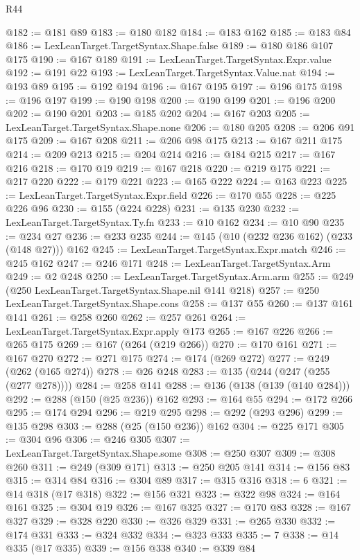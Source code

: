 \begin{lexlean}{R44}
\begin{coremodule}
@182 := @181 @89
@183 := @180 @182
@184 := @183 @162
@185 := @183 @84
@186 := LexLeanTarget.TargetSyntax.Shape.false
@189 := @180 @186 @107 @175
@190 := @167 @189
@191 := LexLeanTarget.TargetSyntax.Expr.value
@192 := @191 @22
@193 := LexLeanTarget.TargetSyntax.Value.nat
@194 := @193 @89
@195 := @192 @194
@196 := @167 @195
@197 := @196 @175
@198 := @196 @197
@199 := @190 @198
@200 := @190 @199
@201 := @196 @200
@202 := @190 @201
@203 := @185 @202
@204 := @167 @203
@205 := LexLeanTarget.TargetSyntax.Shape.none
@206 := @180 @205
@208 := @206 @91 @175
@209 := @167 @208
@211 := @206 @98 @175
@213 := @167 @211 @175
@214 := @209 @213
@215 := @204 @214
@216 := @184 @215
@217 := @167 @216
@218 := @170 @19
@219 := @167 @218
@220 := @219 @175
@221 := @217 @220
@222 := @179 @221
@223 := @165 @222
@224 := @163 @223
@225 := LexLeanTarget.TargetSyntax.Expr.field
@226 := @170 @55
@228 := @225 @226 @96
@230 := @155 (@224 @228)
@231 := @135 @230
@232 := LexLeanTarget.TargetSyntax.Ty.fn
@233 := @10 @162
@234 := @10 @90
@235 := @234 @27
@236 := @233 @235
@244 := @145 (@10 (@232 @236 @162) (@233 (@148 @27))) @162
@245 := LexLeanTarget.TargetSyntax.Expr.match
@246 := @245 @162
@247 := @246 @171
@248 := LexLeanTarget.TargetSyntax.Arm
@249 := @2 @248
@250 := LexLeanTarget.TargetSyntax.Arm.arm
@255 := @249 (@250 LexLeanTarget.TargetSyntax.Shape.nil @141 @218)
@257 := @250 LexLeanTarget.TargetSyntax.Shape.cons
@258 := @137 @55
@260 := @137 @161 @141
@261 := @258 @260
@262 := @257 @261
@264 := LexLeanTarget.TargetSyntax.Expr.apply @173
@265 := @167 @226
@266 := @265 @175
@269 := @167 (@264 (@219 @266))
@270 := @170 @161
@271 := @167 @270
@272 := @271 @175
@274 := @174 (@269 @272)
@277 := @249 (@262 (@165 @274))
@278 := @26 @248
@283 := @135 (@244 (@247 (@255 (@277 @278))))
@284 := @258 @141
@288 := @136 (@138 (@139 (@140 @284)))
@292 := @288 (@150 (@25 @236)) @162
@293 := @164 @55
@294 := @172 @266
@295 := @174 @294
@296 := @219 @295
@298 := @292 (@293 @296)
@299 := @135 @298
@303 := @288 (@25 (@150 @236)) @162
@304 := @225 @171
@305 := @304 @96
@306 := @246 @305
@307 := LexLeanTarget.TargetSyntax.Shape.some
@308 := @250 @307
@309 := @308 @260
@311 := @249 (@309 @171)
@313 := @250 @205 @141
@314 := @156 @83
@315 := @314 @84
@316 := @304 @89
@317 := @315 @316
@318 := 6
@321 := @14 @318 (@17 @318)
@322 := @156 @321
@323 := @322 @98
@324 := @164 @161
@325 := @304 @19
@326 := @167 @325
@327 := @170 @83
@328 := @167 @327
@329 := @328 @220
@330 := @326 @329
@331 := @265 @330
@332 := @174 @331
@333 := @324 @332
@334 := @323 @333
@335 := 7
@338 := @14 @335 (@17 @335)
@339 := @156 @338
@340 := @339 @84

\end{coremodule}
\end{lexlean}
